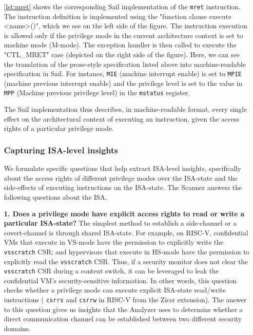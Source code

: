 

\autoref{lst:mret} shows the corresponding Sail implementation of the \texttt{mret} instruction. 
The instruction definition is implemented using the "function clause execute <name>()", which we see on the left side of the figure. 
The instruction execution is allowed only if the privilege mode in the current architecture context is set to machine mode (M-mode). 
The exception handler is then called to execute the "CTL\_MRET" case (depicted on the right side of the figure). 
Here, we can see the translation of the prose-style specification listed above into machine-readable specification in Sail.
For instance, \texttt{MIE} (machine interrupt enable) is set to \texttt{MPIE} (machine previous interrupt enable) and the privilege level is set to the value in \texttt{MPP} (Machine previous privilege level) in the \texttt{mstatus} register. 

The Sail implementation thus describes, in machine-readable format, every single effect on the architectural context of executing an instruction, given the access rights of a particular privilege mode.

\subsubsection{Capturing ISA-level insights}
\label{sec:scanner-insights}
We formulate specific questions that help extract ISA-level insights, specifically about the access rights of different privilege modes over the ISA-state and the side-effects of executing instructions on the ISA-state. 
The Scanner answers the following questions about the ISA. 

\textbf{1. Does a privilege mode have explicit access rights to read or write a particular ISA-state?} 
The simplest method to establish a side-channel or a covert-channel is through shared ISA-state. 
For example, on RISC-V, confidential VMs that execute in VS-mode have the permission to explicitly write the \texttt{vsscratch} CSR; and
hypervisors that execute in HS-mode have the permission to explicitly read the \texttt{vsscratch} CSR. 
Thus, if a security monitor does not clear the \texttt{vsscratch} CSR during a context switch, it can be leveraged to leak the confidential VM's security-sensitive information. 
In other words, this question checks whether a privilege mode can execute explicit ISA-state read/write instructions (\eg{} \texttt{csrrs} and \texttt{csrrw} in RISC-V from the Zicsr extension).
The answer to this question gives us insights that the Analyzer uses to determine whether a direct communication channel can be established between two different security domains. 

